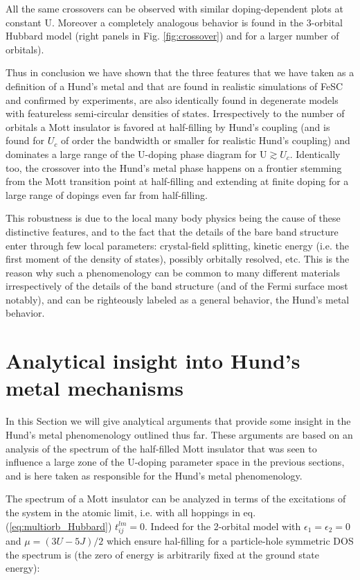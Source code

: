 \documentclass[12pt,twoside]{article}
\def\eps{\epsilon}
\begin{document}
All the same crossovers can be observed with similar doping-dependent plots at constant U. Moreover a completely analogous behavior is found in the 3-orbital Hubbard model (right panels in Fig. \ref{fig:crossover}) and for a larger number of orbitals\cite{demedici-SpringerBook}).

Thus in conclusion we have shown that the three features that we have taken as a definition of a Hund's metal and that are found in realistic simulations of FeSC and confirmed by experiments, are also identically found in degenerate models with featureless semi-circular densities of states. 
Irrespectively to the number of orbitals a Mott insulator is favored at half-filling by Hund's coupling (and is found for $U_c$ of order the bandwidth or smaller for realistic Hund's coupling) and dominates a large range of the U-doping phase diagram for U$\gtrsim U_c$.
Identically too, the crossover into the Hund's metal phase happens on a frontier stemming from the Mott transition point at half-filling and extending at finite doping for a large range of dopings even far from half-filling.

This robustness is due to the local many body physics being the cause of these distinctive features, and to the fact that the details of the bare band structure enter through few local parameters: crystal-field splitting, kinetic energy (i.e. the first moment of the density of states), possibly orbitally resolved, etc. This is the reason why such a phenomenology can be common to many different materials irrespectively of the details of the band structure (and of the Fermi surface most notably), and can be righteously labeled as a general behavior, the Hund's metal behavior.

\section{Analytical insight into Hund's metal mechanisms}\label{sec:analytics}

In this Section we will give analytical arguments that provide some insight in the Hund's metal phenomenology outlined thus far.
These arguments are based on an analysis of the spectrum of the half-filled Mott insulator that was seen to influence a large zone of the U-doping parameter space in the previous sections, and is here taken as responsible for the Hund's metal phenomenology.

The spectrum of a Mott insulator can be analyzed in terms of the excitations of the system in the atomic limit, i.e. with all hoppings in eq. (\ref{eq:multiorb_Hubbard}) $t^{l m}_{ij}=0$. Indeed for the 2-orbital model with $\eps_1=\eps_2=0$ and $\mu=(3U-5J)/2$ which ensure hal-filling for a particle-hole symmetric DOS\cite{demedici_Vietri} the spectrum is (the zero of energy is arbitrarily fixed at the ground state energy):
\end{document}
